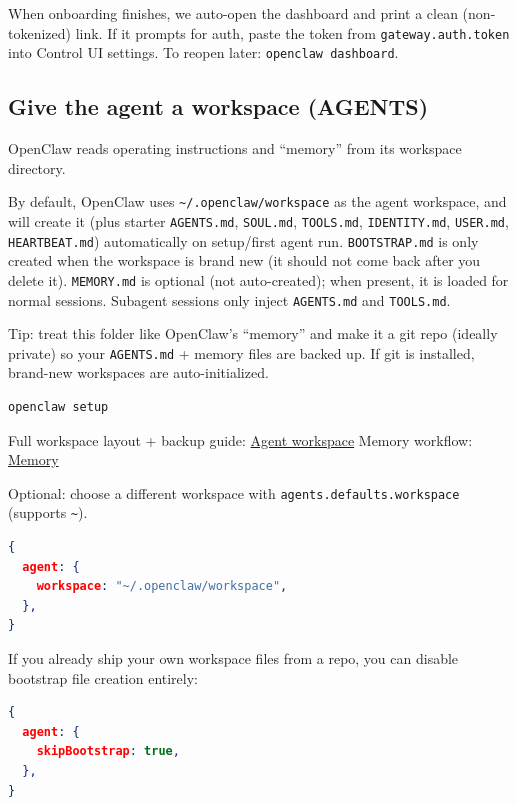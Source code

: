 When onboarding finishes, we auto-open the dashboard and print a clean (non-tokenized) link. If it prompts for auth, paste the token from \texttt{gateway.auth.token} into Control UI settings. To reopen later: \texttt{openclaw dashboard}.

\subsection{Give the agent a workspace (AGENTS)}


OpenClaw reads operating instructions and “memory” from its workspace directory.

By default, OpenClaw uses \texttt{\textasciitilde{}/.openclaw/workspace} as the agent workspace, and will create it (plus starter \texttt{AGENTS.md}, \texttt{SOUL.md}, \texttt{TOOLS.md}, \texttt{IDENTITY.md}, \texttt{USER.md}, \texttt{HEARTBEAT.md}) automatically on setup/first agent run. \texttt{BOOTSTRAP.md} is only created when the workspace is brand new (it should not come back after you delete it). \texttt{MEMORY.md} is optional (not auto-created); when present, it is loaded for normal sessions. Subagent sessions only inject \texttt{AGENTS.md} and \texttt{TOOLS.md}.

Tip: treat this folder like OpenClaw’s “memory” and make it a git repo (ideally private) so your \texttt{AGENTS.md} + memory files are backed up. If git is installed, brand-new workspaces are auto-initialized.

\begin{lstlisting}[language=bash]
openclaw setup
\end{lstlisting}


Full workspace layout + backup guide: \href{/concepts/agent-workspace}{Agent workspace}
Memory workflow: \href{/concepts/memory}{Memory}

Optional: choose a different workspace with \texttt{agents.defaults.workspace} (supports \texttt{\textasciitilde{}}).

\begin{lstlisting}[language=json]
{
  agent: {
    workspace: "~/.openclaw/workspace",
  },
}
\end{lstlisting}


If you already ship your own workspace files from a repo, you can disable bootstrap file creation entirely:

\begin{lstlisting}[language=json]
{
  agent: {
    skipBootstrap: true,
  },
}
\end{lstlisting}


